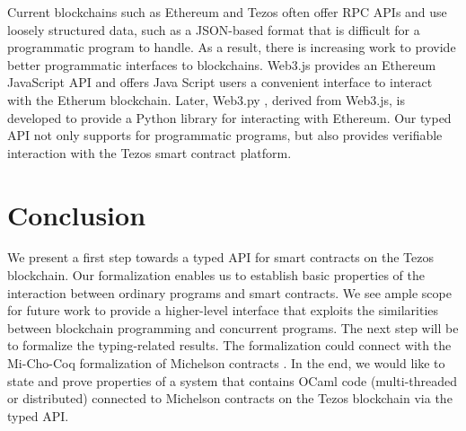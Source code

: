 \documentclass[runningheads]{llncs}
\begin{document}
Current blockchains such as Ethereum \cite{eth-whitepaper} and Tezos \cite{tezos-whitepaper} often offer RPC APIs and use loosely structured data, such as a JSON-based format that is difficult for a programmatic program to handle. As a result, there is increasing work to provide better programmatic interfaces to blockchains. Web3.js \cite{web3.js} provides an Ethereum JavaScript API and offers Java Script users a convenient interface to interact with the Etherum blockchain. Later, Web3.py \cite{web3.py}, derived from Web3.js, is developed to provide a Python library for interacting with Ethereum. Our typed API not only supports for programmatic programs, but also provides verifiable interaction with the Tezos smart contract platform.

\section{Conclusion}
\label{sec:conclusion}

We present a first step towards a typed API for smart contracts on the
Tezos blockchain. Our formalization enables us to establish basic
properties of the interaction between ordinary programs and smart
contracts. We see ample scope for future work to provide a
higher-level interface that exploits the similarities between
blockchain programming and concurrent programs. The next step will be to formalize the typing-related results. The formalization could connect with the Mi-Cho-Coq  formalization of Michelson contracts \cite{DBLP:conf/fm/BernardoCHPT19}. In the end, we would like to state and prove properties of a system that contains OCaml code (multi-threaded or distributed) connected to Michelson contracts on the Tezos blockchain via the typed API.






\end{document}
